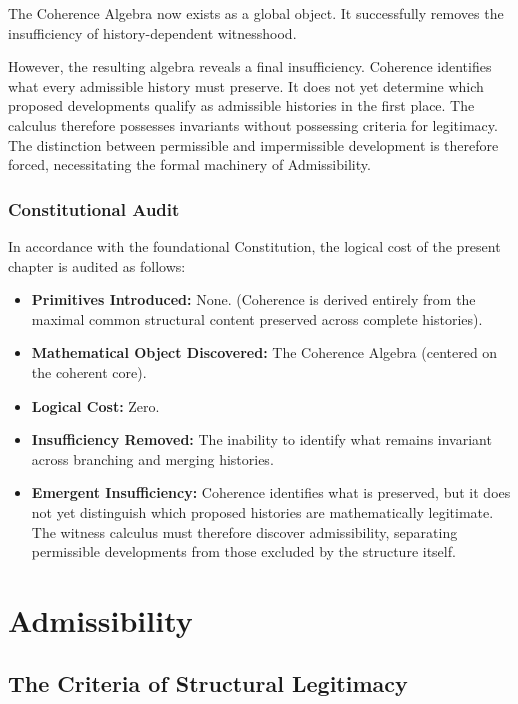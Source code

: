 \documentclass[12pt,anyside]{book}
\begin{document}
The Coherence Algebra now exists as a global object. It successfully removes the insufficiency of history-dependent witnesshood. 

However, the resulting algebra reveals a final insufficiency. Coherence identifies what every admissible history must preserve. It does not yet determine which proposed developments qualify as admissible histories in the first place. The calculus therefore possesses invariants without possessing criteria for legitimacy. The distinction between permissible and impermissible development is therefore forced, necessitating the formal machinery of Admissibility.

\subsection{Constitutional Audit}
In accordance with the foundational Constitution, the logical cost of the present chapter is audited as follows:
\begin{itemize}
    \item \textbf{Primitives Introduced:} None. (Coherence is derived entirely from the maximal common structural content preserved across complete histories).
    \item \textbf{Mathematical Object Discovered:} The Coherence Algebra (centered on the coherent core).
    \item \textbf{Logical Cost:} Zero.
    \item \textbf{Insufficiency Removed:} The inability to identify what remains invariant across branching and merging histories.
    \item \textbf{Emergent Insufficiency:} Coherence identifies what is preserved, but it does not yet distinguish which proposed histories are mathematically legitimate. The witness calculus must therefore discover admissibility, separating permissible developments from those excluded by the structure itself.
\end{itemize}


\chapter{Admissibility}
\setlength{\parindent}{0pt}

\section{The Criteria of Structural Legitimacy}
\end{document}
